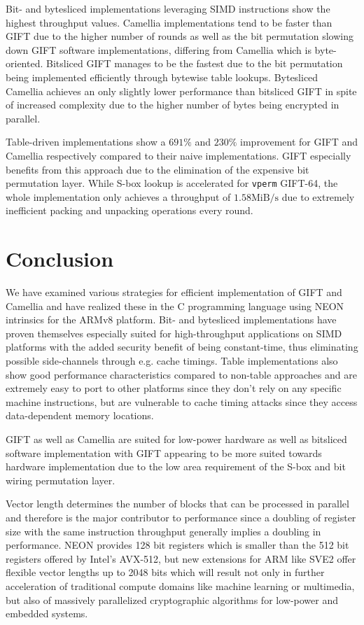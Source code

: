 Bit- and bytesliced implementations leveraging SIMD instructions show the
highest throughput values. Camellia implementations tend to be faster than GIFT
due to the higher number of rounds as well as the bit permutation slowing down
GIFT software implementations, differing from Camellia which is byte-oriented.
Bitsliced GIFT manages to be the fastest due to the bit permutation being
implemented efficiently through bytewise table lookups. Bytesliced Camellia
achieves an only slightly lower performance than bitsliced GIFT in spite of
increased complexity due to the higher number of bytes being encrypted in
parallel.

Table-driven implementations show a $691\%$ and $230\%$ improvement for GIFT
and Camellia respectively compared to their naive implementations. GIFT
especially benefits from this approach due to the elimination of the expensive
bit permutation layer. While S-box lookup is accelerated for \texttt{vperm}
GIFT-64, the whole implementation only achieves a throughput of
$1.58\text{MiB/s}$ due to extremely inefficient packing and unpacking
operations every round.

\section{Conclusion}

We have examined various strategies for efficient implementation of GIFT and
Camellia and have realized these in the C programming language using NEON
intrinsics for the ARMv8 platform. Bit- and bytesliced implementations have
proven themselves especially suited for high-throughput applications on SIMD
platforms with the added security benefit of being constant-time, thus
eliminating possible side-channels through e.g. cache timings. Table
implementations also show good performance characteristics compared to
non-table approaches and are extremely easy to port to other platforms since
they don't rely on any specific machine instructions, but are vulnerable to
cache timing attacks since they access data-dependent memory locations.

GIFT as well as Camellia are suited for low-power hardware as well as bitsliced
software implementation with GIFT appearing to be more suited towards hardware
implementation due to the low area requirement of the S-box and bit wiring
permutation layer.

Vector length determines the number of blocks that can be processed in parallel
and therefore is the major contributor to performance since a doubling of
register size with the same instruction throughput generally implies a doubling
in performance. NEON provides 128 bit registers which is smaller than the 512
bit registers offered by Intel's AVX-512, but new extensions for ARM like SVE2
offer flexible vector lengths up to 2048 bits which will result not only in
further acceleration of traditional compute domains like machine learning or
multimedia, but also of massively parallelized cryptographic algorithms for
low-power and embedded systems.

